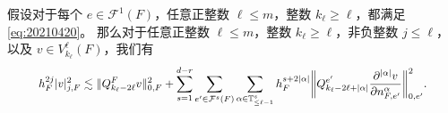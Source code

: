 \begin{lemma}\label{lem:20210420}
假设对于每个 $e\in \mathcal F^1(F)$，任意正整数 $\ell\leq m$，整数 $k_{\ell}\geq\ell$，都满足 \eqref{eq:20210420}。
那么对于任意正整数 $\ell\leq m$，整数 $k_{\ell}\geq\ell$，非负整数 $j\leq \ell$，以及 $v\in V_{k_{\ell}}^{\ell}(F)$，我们有
\begin{equation}\label{eq:20210420-1}
\resizebox{0.9\textwidth}{!}{$\displaystyle
h_F^{2j}|v|_{j,F}^2\lesssim \|Q_{k_{\ell}-2\ell}^Fv\|_{0,F}^2
+ \sum_{s=1}^{d-r}\sum_{e'\in\mathcal F^{s}(F)}\sum_{\alpha\in
\mathbb{T}^{s}_{\leq \ell-1}}h_F^{s+2|\alpha|}\bigg\|Q_{k_{\ell}-2\ell+|\alpha|}^{e'}\frac{\partial^{|\alpha|}v}{\partial \nnn_{F,e'}^{\alpha}}\bigg\|_{0,e'}^2.
$}
\end{equation}
\end{lemma}

